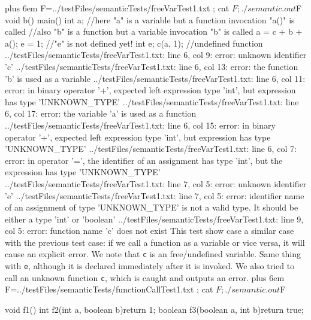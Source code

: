 \documentclass{article}
\makeatletter
\newenvironment{myverb}
 {\def\@xobeysp{\ }\verbatim\rightskip=0pt plus 6em\relax}
 {\endverbatim}
\makeatother
\begin{document}
\begin{itemize}
\begin{myverb}
F=../testFiles/semanticTests/freeVarTest1.txt ; cat $F; ./semantic.out $F
void b(){}
main(){
    int a;
    //here "a" is a variable but a function invocation "a()" is called
    //also "b" is a function but a variable invocation "b" is called
    a = c + b + a();
    e = 1;  //"e" is not defined yet!
    int e;
    c(a, 1); //undefined function
}
../testFiles/semanticTests/freeVarTest1.txt: line 6, col 9: error: unknown identifier 'c'
../testFiles/semanticTests/freeVarTest1.txt: line 6, col 13: error: the function 'b' is used as a variable
../testFiles/semanticTests/freeVarTest1.txt: line 6, col 11: error: in binary operator '+', expected left expression type 'int', but expression has type 'UNKNOWN_TYPE'
../testFiles/semanticTests/freeVarTest1.txt: line 6, col 17: error: the variable 'a' is used as a function
../testFiles/semanticTests/freeVarTest1.txt: line 6, col 15: error: in binary operator '+', expected left expression type 'int', but expression has type 'UNKNOWN_TYPE'
../testFiles/semanticTests/freeVarTest1.txt: line 6, col 7: error: in operator '=', the identifier of an assignment has type 'int', but the expression has type 'UNKNOWN_TYPE'
../testFiles/semanticTests/freeVarTest1.txt: line 7, col 5: error: unknown identifier 'e'
../testFiles/semanticTests/freeVarTest1.txt: line 7, col 5: error: identifier name of an assignment of type 'UNKNOWN_TYPE' is not a valid type. It should be either a type 'int' or 'boolean'
../testFiles/semanticTests/freeVarTest1.txt: line 9, col 5: error: function name 'c' does not exist
\end{myverb}
This test show case a similar case with the previous test case: if we call a function as a variable or vice versa, it will cause an explicit error. We note that \verb|c| is an free/undefined variable. Same thing with \verb|e|, although it is declared immediately after it is invoked. We also tried to call an unknown function \verb|c|, which is caught and outputs an error.
\begin{myverb}
F=../testFiles/semanticTests/functionCallTest1.txt ; cat $F; ./semantic.out $F

void f1(){}
int f2(int a, boolean b){return 1;}
boolean f3(boolean a, int b){return true;}


\end{myverb}
\end{itemize}
\end{document}
